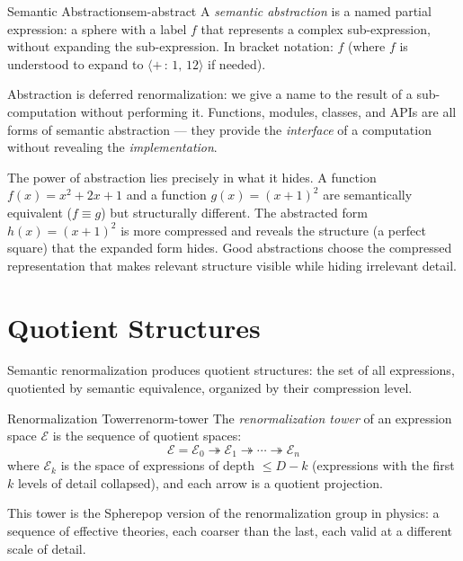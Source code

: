 \begin{definition}{Semantic Abstraction}{sem-abstract}
  A \emph{semantic abstraction} is a named partial expression:
  a sphere with a label $f$ that represents a complex sub-expression,
  without expanding the sub-expression. In bracket notation:
  $f$ (where $f$ is understood to expand to $\langle{+}\,:\,1,\,12\rangle$
  if needed).
\end{definition}

Abstraction is deferred renormalization: we give a name to the
result of a sub-computation without performing it. Functions, modules,
classes, and APIs are all forms of semantic abstraction — they provide
the \emph{interface} of a computation without revealing the
\emph{implementation}.

\begin{remark}
  The power of abstraction lies precisely in what it hides. A function
  $f(x) = x^2 + 2x + 1$ and a function $g(x) = (x+1)^2$ are
  semantically equivalent ($f \equiv g$) but structurally different.
  The abstracted form $h(x) = (x+1)^2$ is more compressed and reveals
  the structure (a perfect square) that the expanded form hides. Good
  abstractions choose the compressed representation that makes relevant
  structure visible while hiding irrelevant detail.
\end{remark}

\section{Quotient Structures}

Semantic renormalization produces quotient structures: the set of
all expressions, quotiented by semantic equivalence, organized by
their compression level.

\begin{definition}{Renormalization Tower}{renorm-tower}
  The \emph{renormalization tower} of an expression space $\mathcal{E}$
  is the sequence of quotient spaces:
  \[
    \mathcal{E} = \mathcal{E}_0 \twoheadrightarrow \mathcal{E}_1
    \twoheadrightarrow \cdots \twoheadrightarrow \mathcal{E}_n
  \]
  where $\mathcal{E}_k$ is the space of expressions of depth $\leq D-k$
  (expressions with the first $k$ levels of detail collapsed), and each
  arrow is a quotient projection.
\end{definition}

This tower is the Spherepop version of the renormalization group in
physics: a sequence of effective theories, each coarser than the last,
each valid at a different scale of detail.

